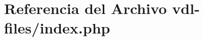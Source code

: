 \hypertarget{vdl-files_2index_8php}{\section{Referencia del Archivo vdl-\/files/index.php}
\label{vdl-files_2index_8php}
}
